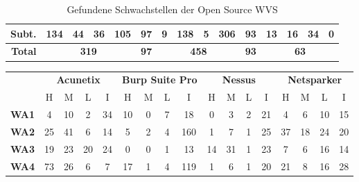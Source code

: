 \documentclass[12pt,oneside,a4paper,parskip]{scrbook}
\begin{document}
\begin{table}[H]
\begin{tabular}{|r|c|c|c|c|c|c|c|c|c|c|c|c|c|c|}
        \hline
        \textbf{Subt.}           & 134  & 44   & 36  & 105               & 97             & 9    & 138  & 5   & 306               & 93              & 13   & 16   & 34  & 0                           \\
        \hline
        \textbf{Total}              & \multicolumn{4}{c|}{\textbf{319}}     & \textbf{97}    & \multicolumn{4}{c|}{\textbf{458}}     & \textbf{93}     & \multicolumn{4}{c|}{\textbf{63}}                \\
        \hline
      \end{tabular}
      \caption[Gefundene Schwachstellen der Open Source WVS]{Gefundene Schwachstellen der Open Source WVS}
    \end{table}
    \begin{table}[H]
      \centering
      \begin{tabular}{|r|c|c|c|c|c|c|c|c|c|c|c|c|c|c|c|c|}
        \cline{2-17}
        \multicolumn{1}{l|}{}    & \multicolumn{4}{c|}{\textbf{Acunetix}}                   & \multicolumn{4}{c|}{\textbf{Burp Suite Pro}}          & \multicolumn{4}{c|}{\textbf{Nessus}}                  & \multicolumn{4}{c|}{\textbf{Netsparker}}                 \\
        \cline{2-17}
        \multicolumn{1}{c|}{}    & H            & M            & L           & I            & H           & M          & L           & I            & H           & M           & L          & I            & H            & M           & L           & I             \\
        \hline
        \textbf{WA1}   & 4            & 10           & 2           & 34           & 10          & 0          & 7           & 18           & 0           & 3           & 2          & 21           & 4            & 6           & 10          & 15            \\
        \hline
        \textbf{WA2}     & 25           & 41           & 6           & 14           & 5           & 2          & 4           & 160          & 1           & 7           & 1          & 25           & 37           & 18          & 24          & 20            \\
        \hline
        \textbf{WA3}       & 19           & 23           & 20          & 24           & 0           & 0          & 1           & 13           & 14          & 31          & 1          & 23           & 7            & 6           & 16          & 14            \\
        \hline
        \textbf{WA4} & 73           & 26           & 6           & 7            & 17          & 1          & 4           & 119          & 1           & 6           & 1          & 20           & 21           & 8           & 16          & 28            \\

\end{tabular}
\end{table}
\end{document}
